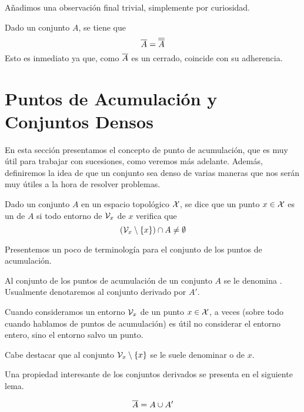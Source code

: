 Añadimos una observación final trivial, simplemente por curiosidad.
\begin{obs}
	Dado un conjunto $A$, se tiene que
	\begin{equation*}
	\overline{A}=\overline{\overline{A}}
	\end{equation*}
	Esto es inmediato ya que, como $\overline{A}$ es un cerrado, coincide con su adherencia.
\end{obs}
\section{Puntos de Acumulación y Conjuntos Densos}
En esta sección presentamos el concepto de punto de acumulación, que es muy útil para trabajar con sucesiones, como veremos más adelante. Además, definiremos la idea de que un conjunto sea denso de varias maneras que nos serán muy útiles a la hora de resolver problemas.
\begin{defi}
	\label{etop_defi_puntoAcumulacion}
	Dado un conjunto $A$ en un espacio topológico $\mathcal{X}$, se dice que un punto $x\in\mathcal{X}$ es un  de $A$ si todo entorno de $\mathcal{V}_x$ de $x$ verifica que
	\begin{equation*}
	(\mathcal{V}_x\setminus\{x\})\cap A\not=\emptyset
	\end{equation*}
\end{defi}
Presentemos un poco de terminología para el conjunto de los puntos de acumulación.
\begin{defi}
	Al conjunto de los puntos de acumulación de un conjunto $A$ se le denomina . Usualmente denotaremos al conjunto derivado por $A'$.
\end{defi}
\begin{obs}
	Cuando consideramos un entorno $\mathcal{V}_x$ de un punto $x\in\mathcal{X}$, a veces (sobre todo cuando hablamos de puntos de acumulación) es útil no considerar el entorno entero, sino el entorno salvo un punto.
	
	Cabe destacar que al conjunto $\mathcal{V}_x\setminus\{x\}$ se le suele denominar  o  de $x$.
\end{obs}
Una propiedad interesante de los conjuntos derivados se presenta en el siguiente lema.
\begin{lem}
	\label{etop_lem_descomposicion}
	\begin{equation*}
	\overline{A}=A\cup A'
	\end{equation*}
\end{lem}

